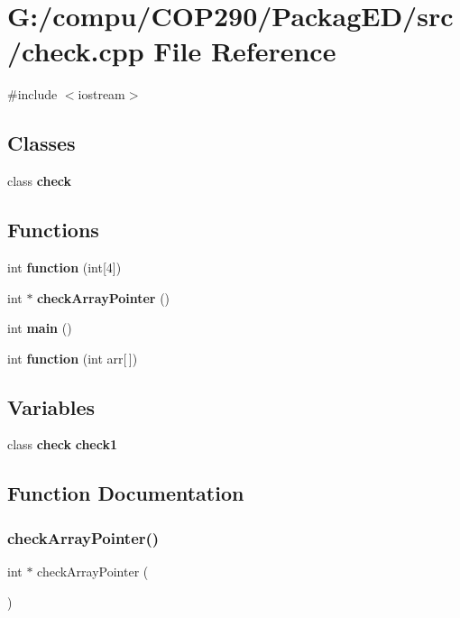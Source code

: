 \section{G\+:/compu/\+C\+O\+P290/\+Packag\+E\+D/src/check.cpp File Reference}
\label{check_8cpp}
{\ttfamily \#include $<$iostream$>$}\newline
\subsection*{Classes}
\begin{DoxyCompactItemize}
\item 
class \textbf{ check}
\end{DoxyCompactItemize}
\subsection*{Functions}
\begin{DoxyCompactItemize}
\item 
int \textbf{ function} (int[4])
\item 
int $\ast$ \textbf{ check\+Array\+Pointer} ()
\item 
int \textbf{ main} ()
\item 
int \textbf{ function} (int arr[$\,$])
\end{DoxyCompactItemize}
\subsection*{Variables}
\begin{DoxyCompactItemize}
\item 
class \textbf{ check} \textbf{ check1}
\end{DoxyCompactItemize}


\subsection{Function Documentation}
\mbox{\label{check_8cpp_a8874c37ad048edac27dd2fbdcd710024}} 
\subsubsection{check\+Array\+Pointer()}
{\footnotesize\ttfamily int $\ast$ check\+Array\+Pointer (\begin{DoxyParamCaption}{ }\end{DoxyParamCaption})}

